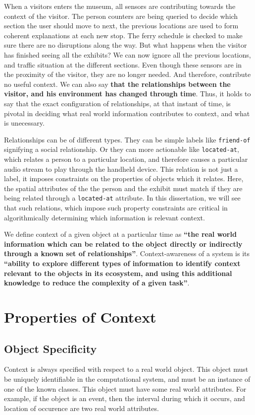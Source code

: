 When a visitors enters the museum, all sensors are contributing towards the context of the visitor. The person counters are being queried to decide which section the user should move to next, the previous locations are used to form coherent explanations at each new stop. The ferry schedule is checked to make sure there are no disruptions along the way. But what happens when the visitor has finished seeing all the exhibits? We can now ignore all the previous locations, and traffic situation at the different sections. Even though these sensors are in the proximity of the visitor, they are no longer needed. And therefore, contribute no useful context. We can also say \textbf{that the relationships between the visitor, and his environment has changed through time}. Thus, it holds to say that the exact configuration of relationships, at that instant of time, is pivotal in deciding what real world information contributes to context, and what is unecessary.

Relationships can be of different types. They can be simple labels like \texttt{friend-of} signifying a social relationship. Or they can more actionable like \texttt{located-at}, which relates a person to a particular location, and therefore causes a particular audio stream to play through the handheld device. This relation is not just a label, it imposes constraints on the properties of objects which it relates. Here, the spatial attributes of the the person and the exhibit must match if they are being related through a \texttt{located-at} attribute. In this dissertation, we will see that such relations, which impose such property constraints are critical in algorithmically determining which information is relevant context.

We define context of a given object at a particular time as \textbf{``the real world information which can be related to the object directly or indirectly through a known set of relationships''}. Context-awareness of a system is its \textbf{``ability to explore different types of information to identify context relevant to the objects in its ecosystem, and using this additional knowledge to reduce the complexity of a given task''}.

\section{Properties of Context}

\subsection{Object Specificity}
Context is always specified with respect to a real world object. This object must be uniquely identifiable in the computational system, and must be an instance of one of the known classes. This object must have some real world attributes. For example, if the object is an event, then the interval during which it occurs, and location of occurence are two real world attributes.

